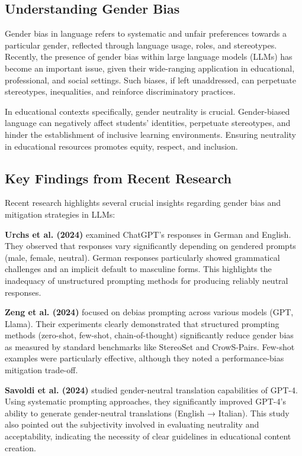 
\subsection{Understanding Gender Bias}

Gender bias in language refers to systematic and unfair preferences towards a particular gender, reflected through language usage, roles, and stereotypes. Recently, the presence of gender bias within large language models (LLMs) has become an important issue, given their wide-ranging application in educational, professional, and social settings. Such biases, if left unaddressed, can perpetuate stereotypes, inequalities, and reinforce discriminatory practices.

In educational contexts specifically, gender neutrality is crucial. Gender-biased language can negatively affect students' identities, perpetuate stereotypes, and hinder the establishment of inclusive learning environments. Ensuring neutrality in educational resources promotes equity, respect, and inclusion.

\subsection{Key Findings from Recent Research}

Recent research highlights several crucial insights regarding gender bias and mitigation strategies in LLMs:

\textbf{Urchs et al. (2024)} examined ChatGPT’s responses in German and English. They observed that responses vary significantly depending on gendered prompts (male, female, neutral). German responses particularly showed grammatical challenges and an implicit default to masculine forms. This highlights the inadequacy of unstructured prompting methods for producing reliably neutral responses.

\textbf{Zeng et al. (2024)} focused on debias prompting across various models (GPT, Llama). Their experiments clearly demonstrated that structured prompting methods (zero-shot, few-shot, chain-of-thought) significantly reduce gender bias as measured by standard benchmarks like StereoSet and CrowS-Pairs. Few-shot examples were particularly effective, although they noted a performance-bias mitigation trade-off.

\textbf{Savoldi et al. (2024)} studied gender-neutral translation capabilities of GPT-4. Using systematic prompting approaches, they significantly improved GPT-4’s ability to generate gender-neutral translations (English → Italian). This study also pointed out the subjectivity involved in evaluating neutrality and acceptability, indicating the necessity of clear guidelines in educational content creation.

